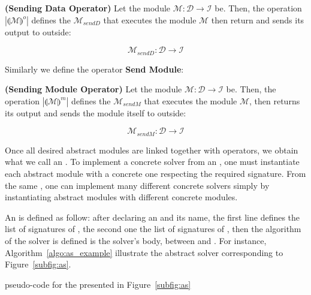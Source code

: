 \begin{definition}\label{op:osend}
{\bf (Sending Data Operator)} Let the module $\mathcal{M} : \mathcal{D} \rightarrow \mathcal{I}$ be. Then, the operation $\left|\llparenthesis \mathcal{M}\rrparenthesis^{o}\right|$ defines the \cm{} $\mathcal{M}_{sendD}$ that executes the module $\mathcal{M}$ then return and sends its output to outside:

\[
\mathcal{M}_{sendD}:\mathcal{D} \rightarrow \mathcal{I}
\]
\end{definition}

Similarly we define the operator \textbf{Send Module}:

\begin{definition}\label{op:msend}
{\bf (Sending Module Operator)} Let the module $\mathcal{M} : \mathcal{D} \rightarrow \mathcal{I}$ be. Then, the operation $\left|\llparenthesis \mathcal{M}\rrparenthesis^{m}\right|$ defines the \cm{} $\mathcal{M}_{sendM}$ that executes the module $\mathcal{M}$, then returns its output and sends the module itself to outside:

\[
\mathcal{M}_{sendM}:\mathcal{D} \rightarrow \mathcal{I}
\]
\end{definition}


Once all desired abstract modules are linked together with operators, we obtain what we call an \as. To implement a concrete solver from an \as, one must instantiate each abstract module with a concrete one respecting the required signature. From the same \as, one can implement many different concrete solvers simply by instantiating abstract modules with different concrete modules.


An \as{} is defined as follow: after declaring an \mbox{} and its name, the first line defines the list of signatures of \oms, the second one the list of signatures of \opchs, then the algorithm of the solver is defined is the solver's body, between \mbox{} and \mbox{}.  For instance, Algorithm~\ref{algo:as_example} illustrate the abstract solver corresponding to Figure~\ref{subfig:as}.


\begin{algorithm}[H]
\dontprintsemicolon
\SetNoline
{}
\caption{\posl{} pseudo-code for the \as{} presented in Figure~\ref{subfig:as}}\label{algo:as_example}
\end{algorithm}	